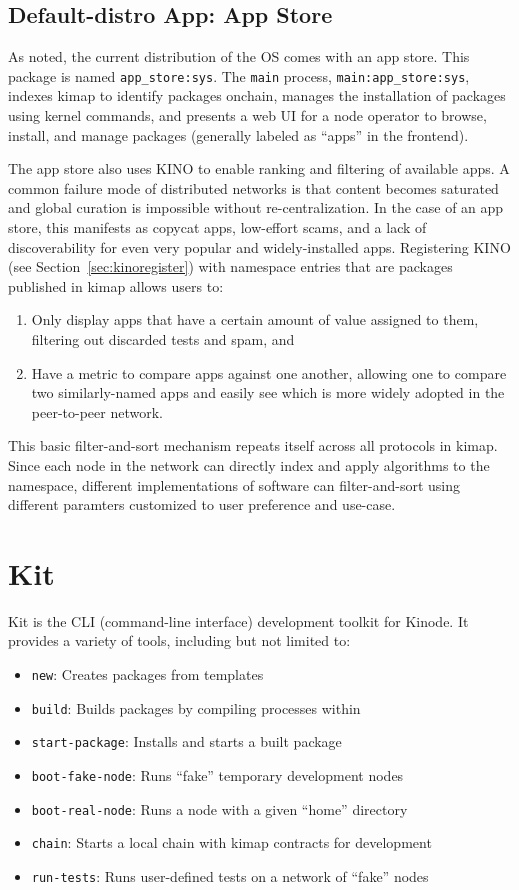 \documentclass[runningheads]{llncs}
\begin{document}
\subsection{Default-distro App: App Store}
\label{sec:appstore}

As noted, the current distribution of the OS comes with an app store.
This package is named \verb|app_store:sys|.
The \verb|main| process, \verb|main:app_store:sys|, indexes kimap to identify packages onchain, manages the installation of packages using kernel commands, and presents a web UI for a node operator to browse, install, and manage packages (generally labeled as ``apps'' in the frontend).

The app store also uses KINO to enable ranking and filtering of available apps.
A common failure mode of distributed networks is that content becomes saturated and global curation is impossible without re-centralization.
In the case of an app store, this manifests as copycat apps, low-effort scams, and a lack of discoverability for even very popular and widely-installed apps.
Registering KINO (see Section~\ref{sec:kinoregister}) with namespace entries that are packages published in kimap allows users to:
\begin{enumerate}
	\item Only display apps that have a certain amount of value assigned to them, filtering out discarded tests and spam, and
	\item Have a metric to compare apps against one another, allowing one to compare two similarly-named apps and easily see which is more widely adopted in the peer-to-peer network.
\end{enumerate}
This basic filter-and-sort mechanism repeats itself across all protocols in kimap.
Since each node in the network can directly index and apply algorithms to the namespace, different implementations of software can filter-and-sort using different paramters customized to user preference and use-case.

\section{Kit}

Kit is the CLI (command-line interface) development toolkit for Kinode.
It provides a variety of tools, including but not limited to:
\begin{itemize}
	\item \verb|new|: Creates packages from templates
	\item \verb|build|: Builds packages by compiling processes within
	\item \verb|start-package|: Installs and starts a built package
	\item \verb|boot-fake-node|: Runs ``fake'' temporary development nodes
	\item \verb|boot-real-node|: Runs a node with a given ``home'' directory
	\item \verb|chain|: Starts a local chain with kimap contracts for development
	\item \verb|run-tests|: Runs user-defined tests on a network of ``fake'' nodes
\end{itemize}
\end{document}
